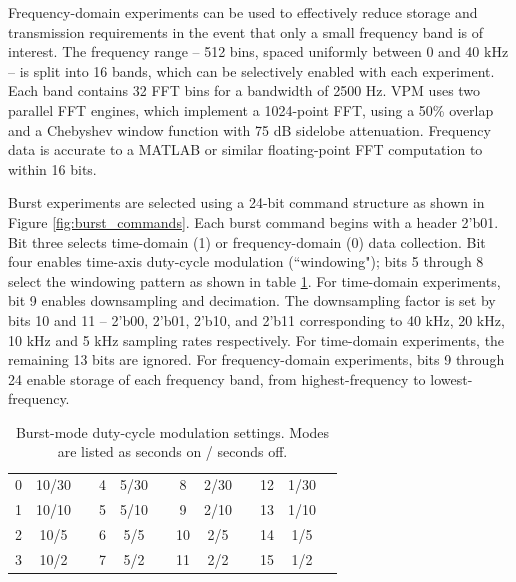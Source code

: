 Frequency-domain experiments can be used to effectively reduce storage and transmission requirements in the event that only a small frequency band is of interest. The frequency range -- 512 bins, spaced uniformly between 0 and 40 kHz -- is split into 16 bands, which can be selectively enabled with each experiment. Each band contains 32 FFT bins for a bandwidth of 2500 Hz. VPM uses two parallel FFT engines, which implement a 1024-point FFT, using a 50\% overlap and a Chebyshev window function with 75 dB sidelobe attenuation. Frequency data is accurate to a MATLAB or similar floating-point FFT computation to within 16 bits. 

Burst experiments are selected using a 24-bit command structure as shown in Figure \ref{fig:burst_commands}. Each burst command begins with a header 2'b01. Bit three selects time-domain (1) or frequency-domain (0) data collection. Bit four enables time-axis duty-cycle modulation (``windowing"); bits 5 through 8 select the windowing pattern as shown in table \ref{tab:windowing}. For time-domain experiments, bit 9 enables downsampling and decimation. The downsampling factor is set by bits 10 and 11 -- 2'b00, 2'b01, 2'b10, and 2'b11 corresponding to 40 kHz, 20 kHz, 10 kHz and 5 kHz sampling rates respectively. For time-domain experiments, the remaining 13 bits are ignored. For frequency-domain experiments, bits 9 through 24 enable storage of each frequency band, from highest-frequency to lowest-frequency. 


\begin{table}
\centering
\caption[Burst mode duty cycle modulation settings]{Burst-mode duty-cycle modulation settings. Modes are listed as seconds on / seconds off.}
\label{tab:windowing}
\centering
\begin{tabular}{c|ccc|ccc|ccc|cc}
 0 & 10/30 & & 4 & 5/30 & & 8 & 2/30 & & 12 & 1/30  \\
 1 & 10/10 & & 5 & 5/10 & & 9 & 2/10 & & 13 & 1/10  \\
 2 & 10/5   & & 6 & 5/5   & & 10  & 2/5   & &  14 &1/5  \\
 3 & 10/2   & & 7 & 5/2   & & 11 & 2/2   & &  15 & 1/2  \\
\end{tabular}
\end{table}


